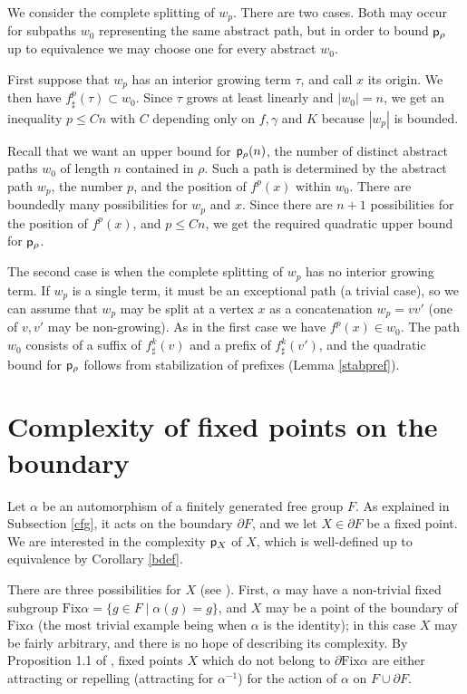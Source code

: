 \documentclass[11pt]{amsart}
\theoremstyle{remark}
\newcommand{\m} {^{-1}}
\newcommand{\Fix}{{\mathrm{Fix}}}
\newcommand{\cp}{{\sf  p}}
\newcommand{\inc}{\subset}
\newcommand{\bo}{\partial}
\begin{document}
 
   
 
 We  consider the complete splitting of $w_p$. 
 There are two cases.  
 Both may occur for subpaths $w_0$ representing the same abstract path,  
 but in order to bound $\cp_\rho$ up to equivalence we may  choose one for every abstract $w_0$.
 
  First suppose that $w_p$ has  an interior  growing term $\tau$, and call $x$ its origin. We then have $f^{p}_\sharp(\tau)\inc w_0$.   
 Since $\tau$ grows at least linearly and $ | w_0 | =n$, we get 
an inequality $p\le Cn$ with $C$ depending only on $f,\gamma$ and $K$  because $ | w_p | $ is bounded.


  
  Recall that we want an upper bound for $\cp_\rho(n)$, the number of distinct abstract paths $w_0$ of length $n$ contained in    
 $\rho$.  
  Such a path is determined by the abstract path $w_p$, the number $p$, and the position of $f^p(x)$ within $w_0$. There are boundedly many possibilities for $w_p$ and $x$.  Since there  are $n+1$ possibilities for the position of  $f^p(x)$, and $p\le Cn$, we get the required quadratic upper bound for   $\cp_\rho$.  
  

 
   The second case is when the complete splitting of $w_p$ has no interior growing term. 
 If $w_p$ is a single term, it must be an exceptional path (a trivial case), so we can assume that $w_p$ may be split   at a vertex $x$ as a concatenation $w_p=vv'$  (one of $v,v'$ may be non-growing).
 As in the first case we have $f^p(x)\in w_0$. The path $w_0$ consists of a suffix of  $f^k_\sharp(v)$ and a prefix of $f^k_\sharp(v')$,
 and the quadratic bound for $\cp_\rho$ follows from stabilization of prefixes (Lemma \ref{stabpref}).
 

\section{Complexity of  fixed points on the boundary}
\label{cfp}

Let $\alpha$ be an automorphism of a finitely generated free group $F$. As explained in Subsection \ref{cfg}, it acts on the boundary $\bo F$, and we let $X\in\bo F$ be a fixed point. We are interested in the complexity $\cp_X$ of $X$, which is well-defined up to equivalence by Corollary \ref{bdef}.


There are three possibilities for $X$ (see \cite{GJLL}). 
First, $\alpha$ may have a non-trivial fixed subgroup $\Fix \alpha =\{g\in F\mid  \alpha(g)=g\}$, and $X$ may be a point of the boundary of $\Fix \alpha$ (the most trivial example being when $\alpha$ is the identity); in this case $X$ may be fairly arbitrary, and there is no hope  of describing its complexity. 
By Proposition 1.1 of \cite{GJLL}, fixed points $X$ which do not  belong to  $ \bo \Fix\alpha$  are   either  attracting or   repelling (attracting for $\alpha\m$)    for the action of $\alpha$ on $F\cup\bo F$.  
\end{document}
